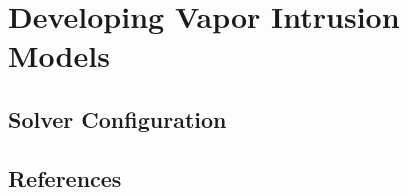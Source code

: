 \documentclass[../thesis.tex]{subfiles}
\begin{document}
\chapter{Developing Vapor Intrusion Models}

\begin{abstract}

\end{abstract}








\section{Solver Configuration}


\section{References}
\begin{comment}
Things to bring up:

- Why is it beneficial to model VI?


- Background on modeling in VI research
-- History & modeling applications
-- Limitations of other people's models
* Should this come before or after my mathematical description of VI?

- Mathematical description of VI modeling
* Start with a non-technical description of a CSM and the processes/physics underlying it. A nice graph showing all of it (including labeled physics and fluxes) would be nice.

- Short description of FEM
-- COMSOL
-- Basic mathematical concept
-- Advantages/disadvantages of this approach compared to others, i.e. why pick FEM over other numerical schemes?
-- Meshing
\end{comment}
\end{document}
